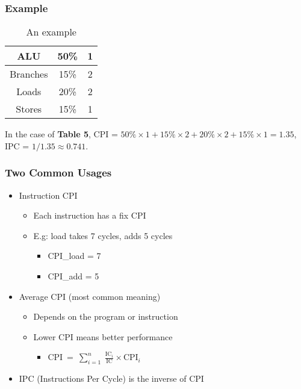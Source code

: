 \documentclass[12pt]{article}
\begin{document}
            \subsubsection{Example}
                \begin{table}[]
                    \centering
                    \begin{tabular}{|c|c|c|}
                        \hline
                        ALU      & 50\% & 1 \\ \hline
                        Branches & 15\% & 2 \\ \hline
                        Loads    & 20\% & 2 \\ \hline
                        Stores   & 15\% & 1 \\ \hline
                    \end{tabular}
                    \caption{An example}
                    \label{tab:my_label}
                \end{table}
                In the case of \textbf{Table 5}, CPI = $50\%\times 1+15\%\times 2+20\%\times 2+15\%\times 1 = 1.35$, IPC = $1/1.35\approx 0.741$.
            \subsubsection{Two Common Usages}
                \begin{itemize}
                    \item {Instruction CPI}\\
                         \begin{itemize}
                            \item {Each instruction has a fix CPI}
                            \item {E.g: load takes 7 cycles, adds 5 cycles}
                            \begin{itemize}
                                \item {CPI\_load = 7}
                                \item {CPI\_add = 5}
                            \end{itemize}
                        \end{itemize} 
                    \item {Average CPI (most common meaning)}
                        \begin{itemize}
                            \item {Depends on the program or instruction}\\
                            \item {Lower CPI means better performance}
                                \begin{itemize}
                                    \item CPI$\:=\:\sum _{i=1}^n\:\frac{\text{IC}_i}{\text{IC}}\times   \text{CPI}_i$
                                \end{itemize}
                        \end{itemize}
                    \item {IPC (Instructions Per Cycle) is the inverse of CPI}
                \end{itemize} 
\end{document}
